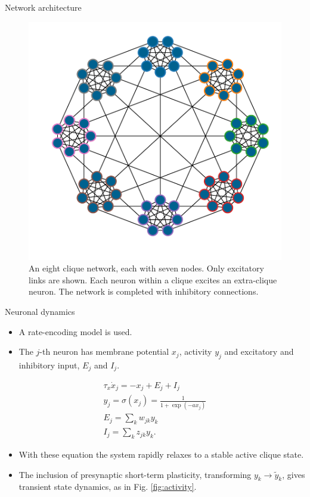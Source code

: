 \documentclass[final,hyperref={pdfpagelabels=false}]{beamer}
\begin{document}
\begin{frame}
\begin{columns}
\begin{column}{.30\textwidth}
\begin{minipage}[T]{.95\textwidth}
{\begin{block}{Network architecture}
			\begin{figure}
				\centering
				\includegraphics[width=.8\linewidth]{network2.pdf}
				\caption{An eight clique network, each with seven nodes. Only excitatory links are shown. Each neuron within a clique excites an extra-clique neuron. The network is completed with inhibitory connections.}
				\label{fig:network}
			\end{figure}
			\end{block}		
							
			\vfil
			\begin{block}{Neuronal dynamics}
				\begin{itemize}
					\item A rate-encoding model is used.
					\item The $j$-th neuron has membrane potential $x_j$, activity $y_j$ and excitatory and inhibitory input, $E_j$ and $I_j$.
				\end{itemize}
			\begin{gather*}
				\tau_x \dot{x}_j = -x_j + E_j + I_j\\
				y_j = \sigma \left(x_j\right) = \frac{1}{1+\exp \left(-a x_j \right) } \\
				E_j = \sum_{k} w_{jk} y_k \\
				I_j = \sum_k z_{jk} y_k.
				\label{eq:neuron}
			\end{gather*}
			\begin{itemize}
				\item With these equation the system rapidly relaxes to a stable active clique state.
				
				\item The inclusion of presynaptic short-term plasticity, transforming $y_k \rightarrow \tilde{y}_k$, gives transient state dynamics, as in Fig. \ref{fig:activity}.
			\end{itemize}		
		

\end{block}}
\end{minipage}
\end{column}
\end{columns}
\end{frame}
\end{document}
